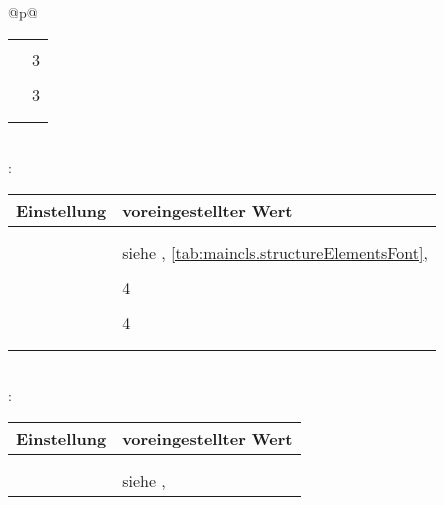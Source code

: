 \begin{longtable}{@{}p{\columnwidth}@{}}
\begin{tabularx}{\linewidth}{ll}
    \PValue{indent}      & \PValue{0pt} \\
    \PValue{level}       & 3 \\
    \PValue{tocindent}   & \PValue{7.0em}\\
    \PValue{toclevel}    & 3 \\
    \PValue{tocnumwidth} & \PValue{4.1em}\\
    \PValue{tocstyle}    & \PValue{section} \\
    \bottomrule
    \end{tabularx} \\
    \addlinespace[\normalbaselineskip]
    : \\*
    \begin{tabularx}{\linewidth}{ll}
    \toprule
    Einstellung & voreingestellter Wert \\
    \midrule\nopagebreak
    \PValue{afterskip}   & \PValue{-1em} \\
    \PValue{beforeskip}  & \PValue{3.25ex plus 1ex minus .2ex} \\
    \PValue{font}        & siehe 
                           \DescRef{maincls.fontelement.paragraph},
                           \autoref{tab:maincls.structureElementsFont}, 
                           \autopageref{tab:maincls.structureElementsFont} \\
    \PValue{indent}      & \PValue{0pt} \\
    \PValue{level}       & 4 \\
    \PValue{tocindent}   & \PValue{10em}\\
    \PValue{toclevel}    & 4 \\
    \PValue{tocnumwidth} & \PValue{5em}\\
    \PValue{tocstyle}    & \PValue{section} \\
    \bottomrule
    \end{tabularx} \\
    \addlinespace[\normalbaselineskip]
    :  \\*
    \begin{tabularx}{\linewidth}{ll}
    \toprule
    Einstellung & voreingestellter Wert \\
    \midrule\nopagebreak
    \PValue{afterskip}   & \PValue{-1em} \\
    \PValue{beforeskip}  & \PValue{3.25ex plus 1ex minus .2ex} \\
    \PValue{font}        & siehe 
                           \DescRef{maincls.fontelement.subparagraph},

\end{tabularx}
\end{longtable}
